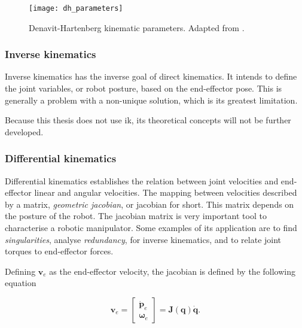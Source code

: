 \begin{figure}[htbp]
	\centering
	\texttt{[image: dh\_parameters]}
	\caption{Denavit-Hartenberg kinematic parameters. Adapted from \cite{Siciliano2009_robotics_modelling_planning_control}.}
	\label{fig:dh_parameters}
\end{figure}


\subsubsection{Inverse kinematics}
\label{subsubsec:inverse_kinematics}

Inverse kinematics has the inverse goal of direct kinematics. It intends to define the joint variables, or robot posture, based on the end-effector pose. This is generally a problem with a non-unique solution, which is its greatest limitation.

Because this thesis does not use \gls{ik}, its theoretical concepts will not be further developed.


\subsubsection{Differential kinematics}
\label{subsubsec:differential_kinematics}

Differential kinematics establishes the relation between joint velocities and end-effector linear and angular velocities. The mapping between velocities described by a matrix, \emph{geometric jacobian}, or jacobian for short. This matrix depends on the posture of the robot. The jacobian matrix is very important tool to characterise a robotic manipulator. Some examples of its application are to find \emph{singularities}, analyse \emph{redundancy}, for inverse kinematics, and to relate joint torques to end-effector forces.

Defining $\boldsymbol{v}_e$ as the end-effector velocity, the jacobian is defined by the following equation

\begin{equation}
    \boldsymbol{v}_e = \begin{bmatrix}
    \dot{\boldsymbol{p}}_e\\
    \boldsymbol{\omega}_e
    \end{bmatrix} = \boldsymbol{J}(\boldsymbol{q})\dot{\boldsymbol{q}}.
\end{equation}


